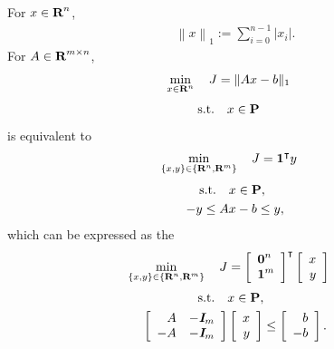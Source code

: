 \documentclass{article}
\begin{document}
    For $x\in\textbf{R}^n$,
    \begin{align*}
        \left\|x\right\|_1 := \sum_{i=0}^{n-1} |x_i|.
    \end{align*}
    For $A\in\textbf{R}^{m\times n}$,
    \begin{align*}
        \min_{x\in\textbf{R}^n}\quad J&= \|Ax-b\|_1
    \end{align*}
    \begin{align*}
        \text{s.t.}\quad&x\in\textbf{P}
    \end{align*}
    is equivalent to 
    \cite[p.~294]{bv_cvxbook}
    \begin{align*}
        \min_{\{x,y\}\in\{\textbf{R}^n,\textbf{R}^m\}}
        \quad J &= \textbf{1}^\intercal y
    \end{align*}
    \begin{align*}
        \text{s.t.}\quad&x\in\textbf{P},\\ 
        -y \leq A&x-b \leq y,
    \end{align*}
    which can be expressed as the \LP
    \begin{align*}
        \min_{\{x,y\}\in\{\textbf{R}^n,\textbf{R}^m\}}
        \quad J &=  \left[\begin{array}{l}
                            \textbf{0}^{n}  \\   \textbf{1}^{m}
                        \end{array}\right]^\intercal
                        \left[\begin{array}{r}
                            x\\
                            y
                        \end{array}\right]
    \end{align*}
    \begin{align*}                
        \text{s.t.}\quad &x\in\textbf{P},\\
            \left[\begin{array}{rr}
                        A   &   -\emph{\textbf{I}} _m    \\
                        -A  &   -\emph{\textbf{I}} _m 
                    \end{array}\right]
                    &\left[\begin{array}{r}
                        x\\
                        y
                    \end{array}\right]
                \leq
                    \left[\begin{array}{r}
                        b\\
                        -b
                    \end{array}\right].
    \end{align*}
\end{document}
